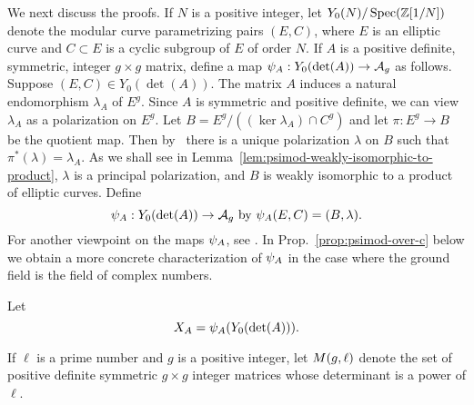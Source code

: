 \documentclass{amsart}
\begin{document}




We next discuss the proofs.
If $N$ is a positive integer, let $Y_0(N)/\operatorname{Spec}(\mathbb{Z}[1/N])$ denote the modular curve parametrizing pairs $(E, C)$, where $E$ is an elliptic curve and $C \subset E$ is a cyclic subgroup of $E$ of order $N$. If $A$ is a positive definite, symmetric, integer $g\times g$ matrix, define a map $\psi_{A}: Y_0(\det(A)) \to \mathcal{A}_g$ as follows. Suppose $(E, C) \in Y_0(\det(A))$. The matrix $A$ induces a natural endomorphism $\lambda_A$ of $E^g$. Since $A$ is symmetric and positive definite, we can view $\lambda_A$ as a polarization on $E^g$. Let $B = E^g/((\ker \lambda_A) \cap C^g)$ and let $\pi: E^g \to B$ be the quotient map. Then by~\cite[Prop.~16.8]{milne-av} there is a unique polarization $\lambda$ on $B$ such that $\pi^*(\lambda) = \lambda_A$. As we shall see in Lemma~\ref{lem:psimod-weakly-isomorphic-to-product}, $\lambda$ is a principal polarization, and $B$ is weakly isomorphic to a product of elliptic curves.  Define
\begin{equation}\label{def:psimoddef}
\psi_{A}: Y_0(\det(A)) \to \mathcal{A}_g  \text{ by } \psi_{A}(E,C) = (B,\lambda).
\end{equation}
For another viewpoint on the maps $\psi_{A}$, see \cite[p. 19 et seq.]{rains}. In Prop.~\ref{prop:psimod-over-c} below we obtain a more concrete characterization of $\psi_{A}$ in the case where the ground field is the field of complex numbers. 

Let
$$X_A=\psi_{A}(Y_0(\det(A))).$$

\begin{definition}\label{def:detl}
If $\ell$ is a prime number and $g$ is a positive integer, let $M(g,\ell)$ denote the set of positive definite symmetric $g \times g$ integer matrices whose determinant is a power of $\ell$.
\end{definition}
\end{document}
